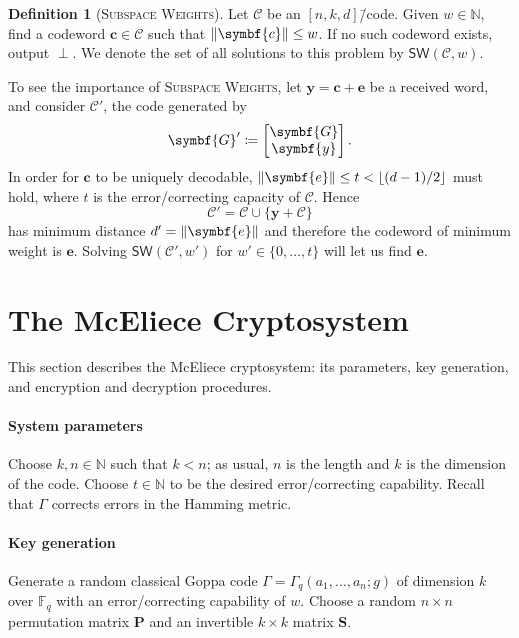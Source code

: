 \documentclass[version=last, paper=A4, parskip=half, oneside]{scrbook}
\theoremstyle{plain}
\theoremstyle{definition}
\newtheorem{definition}{Definition}
\theoremstyle{remark}
\renewcommand*{\vec}{\symbf}
\newcommand*{\mat}{\symbf}
\newcommand*{\FF}{\ensuremath{\mathbb{F}}}
\newcommand*{\NN}{\ensuremath{\mathbb{N}}}
\newcommand*{\Gop}{\ensuremath{\Gamma}}
\newcommand*{\SW}{\ensuremath{\mathsf{SW}}}
\DeclarePairedDelimiter{\floor}{\lfloor}{\rfloor}
\DeclarePairedDelimiter{\norm}{\lVert}{\rVert}
\begin{document}
\begin{definition}[\textsc{Subspace Weights}]
  Let \(\mathcal{C}\) be an \([n, k, d]\)\=/code.  Given \(w \in \NN\), find a
  codeword \(\vec{c} \in \mathcal{C}\) such that \(\norm{\vec{c}} \le w\).  If
  no such codeword exists, output \(\perp\).  We denote the set of all solutions
  to this problem by \(\SW(\mathcal{C}, w)\).
\end{definition}

To see the importance of \textsc{Subspace Weights}, let
\(\vec{y} = \vec{c} + \vec{e}\) be a received word, and consider
\(\mathcal{C}'\), the code generated by
\[
  \mat{G}' \coloneqq \begin{bmatrix} \mat{G} \\ \vec{y} \end{bmatrix}\text.
\]
In order for \(\vec{c}\) to be uniquely decodable,
\(\norm{\vec{e}} \le t < \floor{(d - 1) / {2}}\) must hold, where \(t\) is the
error\-/correcting capacity of \(\mathcal{C}\).  Hence
\[
  \mathcal{C}' = \mathcal{C} \cup \{\vec{y} + \mathcal{C}\}
\]
has minimum distance \(d' = \norm{\vec{e}}\) and therefore the codeword of
minimum weight is \(\vec{e}\).  Solving \(\SW(\mathcal{C}', w')\) for
\(w' \in \{0, \ldots, t\}\) will let us find \(\vec{e}\).

\section{The McEliece Cryptosystem}

This section describes the McEliece cryptosystem: its parameters, key
generation, and encryption and decryption procedures.

\paragraph{System parameters} Choose \(k, n \in \NN\) such that \(k < n\); as
usual, \(n\) is the length and \(k\) is the dimension of the code.  Choose
\(t \in \NN\) to be the desired error\-/correcting capability.  Recall that
\(\Gop\) corrects errors in the Hamming metric.

\paragraph{Key generation} Generate a random classical Goppa code
\(\Gop = \Gop_q(a_1, \ldots, a_n; g)\) of dimension \(k\) over \(\FF_q\) with
an error\-/correcting capability of \(w\).  Choose a random \(n \times n\)
permutation matrix \(\mat{P}\) and an invertible \(k \times k\) matrix
\(\mat{S}\).
\end{document}
